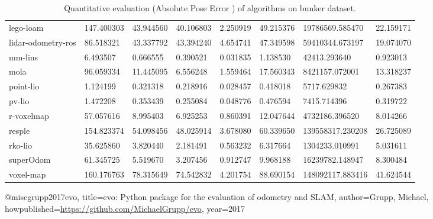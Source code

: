 \begin{table}[]
{\begin{tabular}{llllllll}
		lego-loam & 147.400303 & 43.944560 & 40.106803 & 2.250919 & 49.215376 & 19786569.585470 & 22.159171 \\
		lidar-odometry-ros & 86.518321 & 43.337792 & 43.394240 & 4.654741 & 47.349598 & 59410344.673197 & 19.074070 \\
		mm-lins & 6.493507 & 0.666555 & 0.390521 & 0.031835 & 1.138530 & 42413.293640 & 0.923013 \\
		mola & 96.059334 & 11.445095 & 6.556248 & 1.559464 & 17.560343 & 8421157.072001 & 13.318237 \\
		point-lio & 1.124199 & 0.321318 & 0.218916 & 0.028457 & 0.418018 & 5717.629832 & 0.267383 \\
		pv-lio & 1.472208 & 0.353439 & 0.255084 & 0.048776 & 0.476594 & 7415.714396 & 0.319722 \\
		r-voxelmap & 57.057616 & 8.995403 & 6.925253 & 0.860391 & 12.047644 & 4732186.396520 & 8.014266 \\
		resple & 154.823374 & 54.098456 & 48.025914 & 3.678080 & 60.339650 & 139558317.230208 & 26.725089 \\
		rko-lio & 35.625860 & 3.820440 & 2.181491 & 0.563232 & 6.317664 & 1304233.010991 & 5.031611 \\
		superOdom & 61.345725 & 5.519670 & 3.207456 & 0.912747 & 9.968188 & 16239782.148947 & 8.300484 \\
		voxel-map & 160.176763 & 78.315649 & 74.542832 & 4.201754 & 88.690154 & 148092117.883416 & 41.624544 \\
        	\end{tabular}%
        }
        	\caption{Quantitative evaluation (Absolute Pose Error \cite{grupp2017evo}) of algorithms on bunker dataset.}
        	\label{table3}
\end{table}

@misc{grupp2017evo,
  title={evo: Python package for the evaluation of odometry and SLAM},
  author={Grupp, Michael},
  howpublished={\url{https://github.com/MichaelGrupp/evo}},
  year={2017}
}
